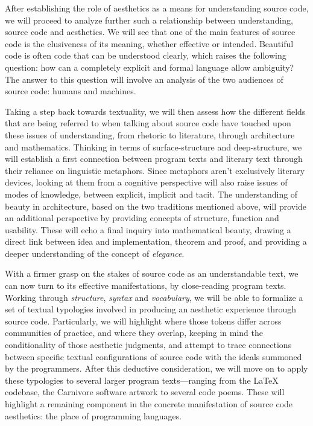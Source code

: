 After establishing the role of aesthetics as a means for understanding source code, we will proceed to analyze further such a relationship between understanding, source code and aesthetics. We will see that one of the main features of source code is the elusiveness of its meaning, whether effective or intended. Beautiful code is often code that can be understood clearly, which raises the following question: how can a completely explicit and formal language allow ambiguity? The answer to this question will involve an analysis of the two audiences of source code: humans and machines.

Taking a step back towards textuality, we will then assess how the different fields that are being referred to when talking about source code have touched upon these issues of understanding, from rhetoric to literature, through architecture and mathematics. Thinking in terms of surface-structure and deep-structure, we will establish a first connection between program texts and literary text through their reliance on linguistic metaphors. Since metaphors aren't exclusively literary devices, looking at them from a cognitive perspective will also raise issues of modes of knowledge, between explicit, implicit and tacit. The understanding of beauty in architecture, based on the two traditions mentioned above, will provide an additional perspective by providing concepts of structure, function and usability. These will echo a final inquiry into mathematical beauty, drawing a direct link between idea and implementation, theorem and proof, and providing a deeper understanding of the concept of \emph{elegance}.

With a firmer grasp on the stakes of source code as an understandable text, we can now turn to its effective manifestations, by close-reading program texts. Working through \emph{structure}, \emph{syntax} and \emph{vocabulary}, we will be able to formalize a set of textual typologies involved in producing an aesthetic experience through source code. Particularly, we will highlight where those tokens differ across communities of practice, and where they overlap, keeping in mind the conditionality of those aesthetic judgments, and attempt to trace connections between specific textual configurations of source code with the ideals summoned by the programmers. After this deductive consideration, we will move on to apply these typologies to several larger program texts—ranging from the LaTeX codebase, the Carnivore software artwork to several code poems. These will highlight a remaining component in the concrete manifestation of source code aesthetics: the place of programming languages.

